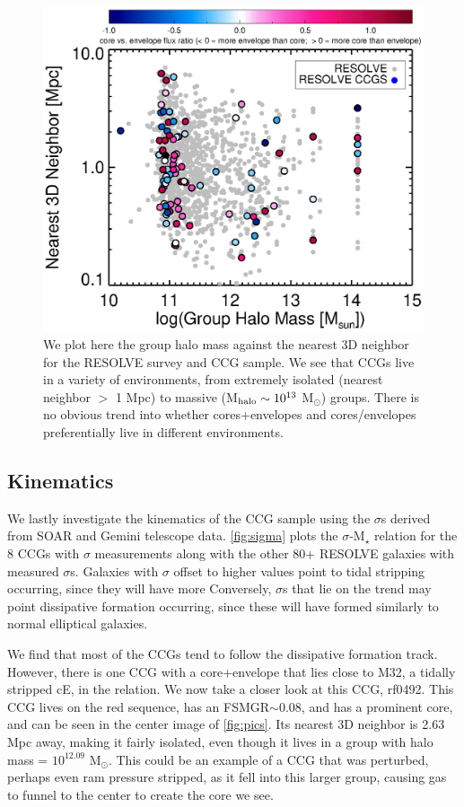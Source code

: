 \documentclass[iop,apj]{emulateapj}
\begin{document}
\begin{figure}[hbpt!]
\begin{center}
\includegraphics{nn_groupmass.eps}
\caption{We plot here the group halo mass against the nearest 3D neighbor for the RESOLVE survey and CCG sample. We see that CCGs live in a variety of environments, from extremely isolated (nearest neighbor $>$ 1 Mpc) to massive (M$_{\rm halo} \sim 10^{13}$ M$_{\odot}$) groups. There is no obvious trend into whether cores+envelopes and cores/envelopes preferentially live in different environments.}
\label{fig:envplot}
\end{center}
\end{figure}

\subsection{Kinematics}
\label{kin}
\noindent We lastly investigate the kinematics of the CCG sample using the $\sigma$s derived from SOAR and Gemini telescope data. \autoref{fig:sigma} plots the $\sigma$-M$_{\star}$ relation for the 8 CCGs with $\sigma$ measurements along with the other 80+ RESOLVE galaxies with measured $\sigma$s. Galaxies with $\sigma$ offset to higher values point to tidal stripping occurring, since  they will have more  Conversely, $\sigma$s that lie on the trend may point dissipative formation occurring, since these will have formed similarly to normal elliptical galaxies.

We find that most of the CCGs tend to follow the dissipative formation track. However, there is one CCG with a core+envelope that lies close to M32, a tidally stripped cE, in the relation. We now take a closer look at this CCG, rf0492. This CCG lives on the red sequence, has an FSMGR$\sim 0.08$, and has a prominent core, and can be seen in the center image of \autoref{fig:pics}. Its nearest 3D neighbor is 2.63 Mpc away, making it fairly isolated, even though it lives in a group with halo mass = $10^{12.09}$ M$_{\odot}$. This could be an example of a CCG that was perturbed, perhaps even ram pressure stripped, as it fell into this larger group, causing gas to funnel to the center to create the core we see. 
\end{document}
